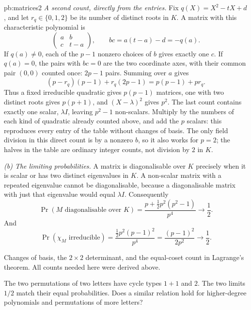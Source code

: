 \begin{solution}{pb:matrices2}
\emph{A second count, directly from the entries.}
Fix $q(X)=X^2-tX+d$, and let $r_q\in\{0,1,2\}$ be its number of
distinct roots in $K$. A matrix with this characteristic polynomial is
\[
\begin{pmatrix}a&b\\c&t-a\end{pmatrix},\qquad
bc=a(t-a)-d=-q(a).
\]
If $q(a)\ne0$, each of the $p-1$ nonzero choices of $b$ gives exactly
one $c$. If $q(a)=0$, the pairs with $bc=0$ are the two coordinate axes,
with their common pair $(0,0)$ counted once: $2p-1$ pairs. Summing over $a$
gives
\[
(p-r_q)(p-1)+r_q(2p-1)=p(p-1)+pr_q.
\]
Thus a fixed irreducible quadratic gives $p(p-1)$ matrices, one with two
distinct roots gives $p(p+1)$, and $(X-\lambda)^2$ gives $p^2$.
The last count contains exactly one scalar, $\lambda I$, leaving
$p^2-1$ non-scalars. Multiply by the numbers of each kind of quadratic
already counted above, and add the $p$ scalars: this reproduces every entry
of the table without changes of basis. The only field division in this
direct count is by a nonzero $b$, so it also works for $p=2$; the halves
in the table are ordinary integer counts, not division by $2$ in $K$.

\emph{(b) The limiting probabilities.}
A matrix is diagonalisable over $K$ precisely when it is scalar or has two distinct eigenvalues in $K$. A non-scalar matrix with a repeated eigenvalue cannot be diagonalisable, because a diagonalisable matrix with just that eigenvalue would equal $\lambda I$. Consequently
\[
\Pr(M\text{ diagonalisable over }K)
=\frac{p+\frac12p^2(p^2-1)}{p^4}
\longrightarrow\frac12.
\]
And
\[
\Pr(\chi_M\text{ irreducible})
=\frac{\frac12p^2(p-1)^2}{p^4}
=\frac{(p-1)^2}{2p^2}\longrightarrow\frac12.
\]

\tools Changes of basis, the $2\times2$ determinant, and the equal-coset count in Lagrange's theorem. All counts needed here were derived above.

\leads The two permutations of two letters have cycle types $1+1$ and $2$.
The two limits $1/2$ match their equal probabilities. Does a similar relation
hold for higher-degree polynomials and permutations of more letters?
\end{solution}

